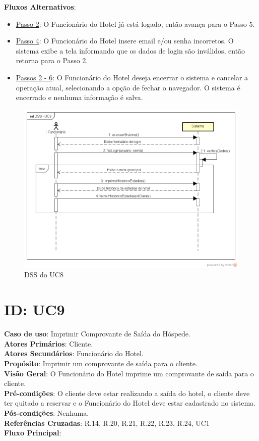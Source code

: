 \documentclass[notitlepage]{article}
\begin{document}
\textbf{Fluxos Alternativos}:\\
\begin{itemize}
\item \underline{Passo 2}: O Funcionário do Hotel já está logado, então avança para o Passo 5.
\item \underline{Passo 4}: O Funcionário do Hotel insere email e/ou senha incorretos. O sistema exibe a tela informando que os dados de login são inválidos, então retorna para o Passo 2.
\item \underline{Passos 2 - 6}: O Funcionário do Hotel deseja encerrar o sistema e cancelar a operação atual, selecionando a opção de fechar o navegador. O sistema é encerrado e nenhuma informação é salva.  
\end{itemize}
\begin{figure}[!htbp]
	\centering
  \includegraphics[scale=0.65]{UC8.png}
  \caption{DSS do UC8}
  \label{fig:UC8}
\end{figure}

\clearpage

\section{ID: UC9}
\noindent\textbf{Caso de uso}: Imprimir Comprovante de Saída do Hóspede.\\
\textbf{Atores Primários}: Cliente. \\
\textbf{Atores Secundários}: Funcionário do Hotel.\\
\textbf{Propósito}: Imprimir um comprovante de saída para o cliente.\\
\textbf{Visão Geral}: O Funcionário do Hotel imprime um comprovante de saída para o cliente.\\
\textbf{Pré-condições}: O cliente deve estar realizando a saída do hotel, o cliente deve ter quitado a reservar e o Funcionário do Hotel deve estar cadastrado no sistema.\\
\textbf{Pós-condições}: Nenhuma.\\
\textbf{Referências Cruzadas}: R.14, R.20, R.21, R.22, R.23, R.24, UC1\\
\newline
\textbf{Fluxo Principal}:\\
\end{document}
